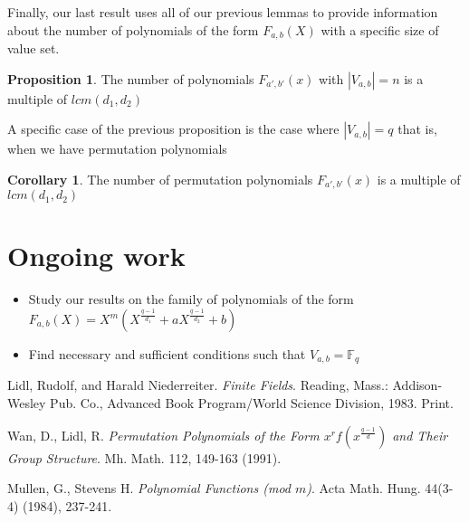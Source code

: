 \documentclass{article}
\theoremstyle{definition}
\newtheorem{corollary}[theorem]{Corollary}
\newtheorem{prop}[theorem]{Proposition}
\theoremstyle{remark}
\numberwithin{equation}{section}
\begin{document}
Finally, our last result uses all of our previous lemmas to provide information about the number of polynomials of the form $F_{a,b}(X)$ with a specific size of value set.

\begin{prop}

  The number of polynomials $F_{a', b'}(x)$ with $|V_{a, b}| = n$ is a multiple of $lcm(d_1,d_2)$

\end{prop}
    
A specific case of the previous proposition is the case where $|V_{a, b}| = q$ that is, when we have permutation polynomials

\begin{corollary}
  The number of permutation polynomials $F_{a', b'}(x)$ is a multiple of $lcm(d_1,d_2)$  
\end{corollary}

\section{Ongoing work}    

    \begin{itemize}
    \item Study our results on the family of polynomials of the form $F_{a,b}(X) = X^m(X^{\frac{q-1}{d_1}} + aX^{\frac{q-1}{d_2}} +b)$
    \item Find necessary and sufficient conditions such that $V_{a,b} = \mathbb{F}_q$
  \end{itemize}
 
\begin{thebibliography}{}

  \item Lidl, Rudolf, and Harald Niederreiter. \textit{Finite Fields}. Reading, Mass.: Addison-Wesley Pub. Co., Advanced Book Program/World Science Division, 1983. Print. 
  \item Wan, D., Lidl, R. \textit{Permutation Polynomials of the Form $x^{r}f(x^{\frac{q-1}{d}})$ and Their Group Structure}. Mh. Math. 112, 149-163 (1991).
  \item Mullen, G., Stevens H. \textit{Polynomial Functions (mod $m$)}. Acta Math. Hung. 44(3-4) (1984), 237-241.

\end{thebibliography}
\end{document}
